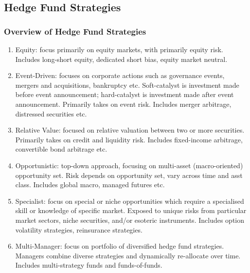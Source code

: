 \subsection{Hedge Fund Strategies}

\subsubsection{Overview of Hedge Fund Strategies}

\begin{remark} 
\begin{enumerate}[label=\roman*.]
\setlength{\itemsep}{0pt}
\item Equity: focus primarily on equity markets, with primarily equity risk. Includes long-short equity, dedicated short bias, equity market neutral.
\item Event-Driven: focuses on corporate actions such as governance events, mergers and acquisitions, bankruptcy etc. Soft-catalyst is investment made before event announcement; hard-catalyst is investment made after event announcement. Primarily takes on event risk. Includes merger arbitrage, distressed securities etc.
\item Relative Value: focused on relative valuation between two or more securities. Primarily takes on credit and liquidity risk. Includes fixed-income arbitrage, convertible bond arbitrage etc.
\item Opportunistic: top-down approach, focusing on multi-asset (macro-oriented) opportunity set. Risk depends on opportunity set, vary across time and asst class. Includes global macro, managed futures etc.
\item Specialist: focus on special or niche opportunities which require a specialised skill or knowledge of specific market. Exposed to unique risks from particular market sectors, niche securities, and/or esoteric instruments. Includes option volatility strategies, reinsurance strategies.
\item Multi-Manager: focus on portfolio of diversified hedge fund strategies. Managers combine diverse strategies and dynamically re-allocate over time. Includes multi-strategy funds and funds-of-funds.
\end{enumerate}
\end{remark}

